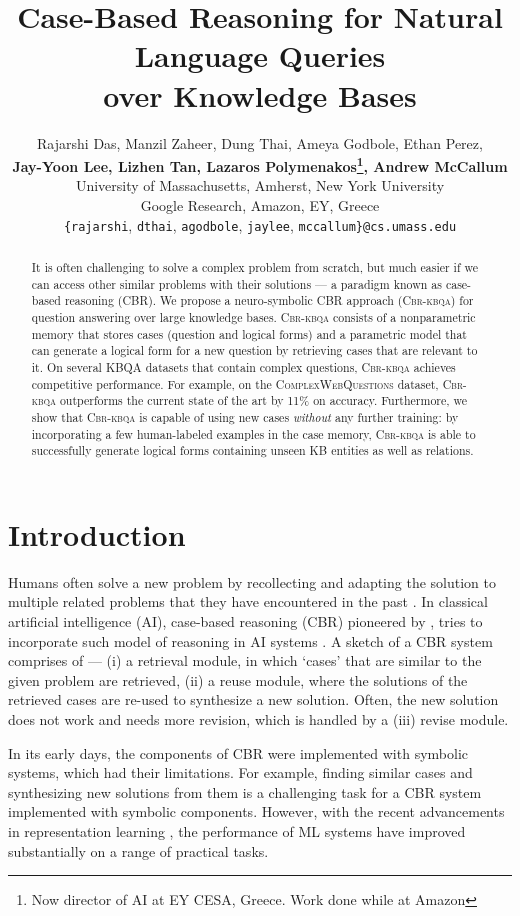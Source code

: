 \documentclass[11pt]{article}
\title{Case-Based Reasoning for Natural Language Queries \\over Knowledge Bases}
\author{Rajarshi Das, Manzil Zaheer, Dung Thai, Ameya Godbole, Ethan Perez, \\\textbf{Jay-Yoon Lee, Lizhen Tan, Lazaros Polymenakos\thanks{Now director of AI at EY CESA, Greece. Work done while at Amazon}, Andrew McCallum}\\
University of Massachusetts, Amherst, New York University\\
Google Research, Amazon, EY, Greece\\
\texttt{\{rajarshi}, \texttt{dthai}, \texttt{agodbole}, \texttt{jaylee}, \texttt{mccallum\}}\texttt{@cs.umass.edu}
}
\newcommand{\cwq}{\textsc{ComplexWebQuestions}\xspace}
\newcommand{\alg}{\textsc{Cbr-kbqa}\xspace}
\begin{document}
\maketitle
\begin{abstract}

It is often challenging to solve a complex problem from scratch, but much easier if we can access other similar problems with their solutions --- a paradigm known as case-based reasoning (CBR).
We propose a neuro-symbolic CBR approach (\alg) for question answering over large knowledge bases. \alg consists of a nonparametric memory that stores cases (question and logical forms) and a parametric model that can generate a logical form for a new question by retrieving cases that are relevant to it. On several KBQA datasets that contain complex questions, \alg achieves competitive performance. For example, on the \cwq dataset, \alg outperforms the current state of the art by 11\% on accuracy. Furthermore, we show that \alg is capable of using new cases \emph{without} any further training: by incorporating a few human-labeled examples in the case memory, \alg is able to successfully generate logical forms containing unseen KB entities as well as relations.

\end{abstract}

\section{Introduction}
\label{sec:intro}
Humans often solve a new problem by recollecting and adapting the solution to multiple related problems that they have encountered in the past \cite{ross1984remindings,lancaster1987problem,schmidt1990cognitive}. In classical artificial intelligence (AI), case-based reasoning (CBR) pioneered by \citet{schank1982dynamic}, tries to incorporate such model of reasoning in AI systems \cite{kolodner1983maintaining,rissland1983examples,leake1996cbr}. A sketch of a CBR system \cite{aamodt1994case} comprises of --- (i) a retrieval module, in which `cases' that are similar to the given problem are retrieved, (ii) a reuse module, where the solutions of the retrieved cases are re-used to synthesize a new solution. Often, the new solution does not work and needs more revision, which is handled by a (iii) revise module.

In its early days, the components of CBR were implemented with symbolic systems, which had their limitations. For example, finding similar cases and synthesizing new solutions from them is a challenging task for a CBR system implemented with symbolic components. However, with the recent advancements in representation learning \cite{lecun2015deep}, the performance of ML systems have improved substantially on a range of practical tasks.  
\end{document}
